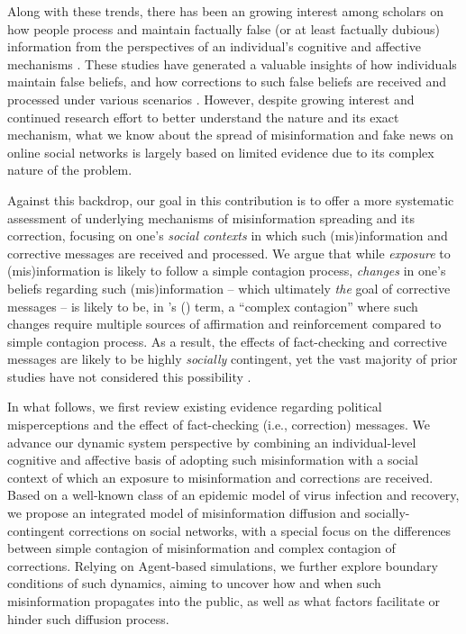 \documentclass[man, 12pt, a4paper]{apa6}
\begin{document}
  Along with these trends, there has been an growing interest among scholars on how people process and maintain factually false (or at least factually dubious) information from the perspectives of an individual's cognitive and affective mechanisms \parencite{Lewandowsky_2012PSPI, kuklinski2000misinformation, garrett2016driving, weeks2015emotions}. These studies have generated a valuable insights of how individuals maintain false beliefs, and how corrections to such false beliefs are received and processed under various scenarios \parencite{Lewandowsky_2012PSPI, thorson_2016}. However, despite growing interest and continued research effort to better understand the nature and its exact mechanism, what we know about the spread of misinformation and fake news on online social networks is largely based on limited evidence due to its complex nature of the problem.

  Against this backdrop, our goal in this contribution is to offer a more systematic assessment of underlying mechanisms of misinformation spreading and its correction, focusing on one's \emph{social contexts} in which such (mis)information and corrective messages are received and processed. We argue that while \emph{exposure} to (mis)information is likely to follow a simple contagion process, \emph{changes} in one's beliefs regarding such (mis)information -- which ultimately \emph{the} goal of corrective messages -- is likely to be, in \citeauthor{centola2007complex}'s (\citeyear{centola2007complex}) term, a \enquote{complex contagion} where such changes require multiple sources of affirmation and reinforcement compared to simple contagion process. As a result, the effects of fact-checking and corrective messages are likely to be highly \emph{socially} contingent, yet the vast majority of prior studies have not considered this possibility \parencite{margolin2017, bode2017see}.    

  In what follows, we first review existing evidence regarding political misperceptions and the effect of fact-checking (i.e., correction) messages. We advance our dynamic system perspective by combining an individual-level cognitive and affective basis of adopting such misinformation with a social context of which an exposure to misinformation and corrections are received. Based on a well-known class of an epidemic model of virus infection and recovery, we propose an integrated model of misinformation diffusion and socially-contingent corrections on social networks, with a special focus on the differences between simple contagion of misinformation and complex contagion of corrections. Relying on Agent-based simulations, we further explore boundary conditions of such dynamics, aiming to uncover how and when such misinformation propagates into the public, as well as what factors facilitate or hinder such diffusion process.
\end{document}
